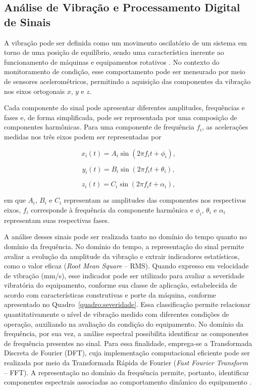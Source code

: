 \documentclass[conference]{IEEEtran}
\begin{document}
\subsection{Análise de Vibração e Processamento Digital de Sinais}

A vibração pode ser definida como um movimento oscilatório de um sistema em torno de uma posição de equilíbrio, sendo uma característica inerente ao funcionamento de máquinas e equipamentos rotativos \cite{girdhar2004practical}. No contexto do monitoramento de condição, esse comportamento pode ser mensurado por meio de sensores acelerométricos, permitindo a aquisição das componentes da vibração nos eixos ortogonais $x$, $y$ e $z$.

Cada componente do sinal pode apresentar diferentes amplitudes, frequências e fases e, de forma simplificada, pode ser representada por uma composição de componentes harmônicas. Para uma componente de frequência $f_i$, as acelerações medidas nos três eixos podem ser representadas por

\begin{equation}
x_i(t) = A_i \sin(2\pi f_i t + \phi_i),
\label{equation:x_move}
\end{equation}

\begin{equation}
y_i(t) = B_i \sin(2\pi f_i t + \theta_i),
\label{equation:y_move}
\end{equation}

\begin{equation}
z_i(t) = C_i \sin(2\pi f_i t + \alpha_i),
\label{equation:z_move}
\end{equation}

em que $A_i$, $B_i$ e $C_i$ representam as amplitudes das componentes nos respectivos eixos, $f_i$ corresponde à frequência da componente harmônica e $\phi_i$, $\theta_i$ e $\alpha_i$ representam suas respectivas fases.

A análise desses sinais pode ser realizada tanto no domínio do tempo quanto no domínio da frequência. No domínio do tempo, a representação do sinal permite avaliar a evolução da amplitude da vibração e extrair indicadores estatísticos, como o valor eficaz (\textit{Root Mean Square} -- RMS). Quando expresso em velocidade de vibração (mm/s), esse indicador pode ser utilizado para avaliar a severidade vibratória do equipamento, conforme sua classe de aplicação, estabelecida de acordo com características construtivas e porte da máquina, conforme apresentado no Quadro~\ref{quadro:severidade}. Essa classificação permite relacionar quantitativamente o nível de vibração medido com diferentes condições de operação, auxiliando na avaliação da condição do equipamento. No domínio da frequência, por sua vez, a análise espectral possibilita identificar as componentes de frequência presentes no sinal. Para essa finalidade, emprega-se a Transformada Discreta de Fourier (DFT), cuja implementação computacional eficiente pode ser realizada por meio da Transformada Rápida de Fourier (\textit{Fast Fourier Transform} -- FFT). A representação no domínio da frequência permite, portanto, identificar componentes espectrais associadas ao comportamento dinâmico do equipamento \cite{girdhar2004practical,randall2011vibration}.
\end{document}
